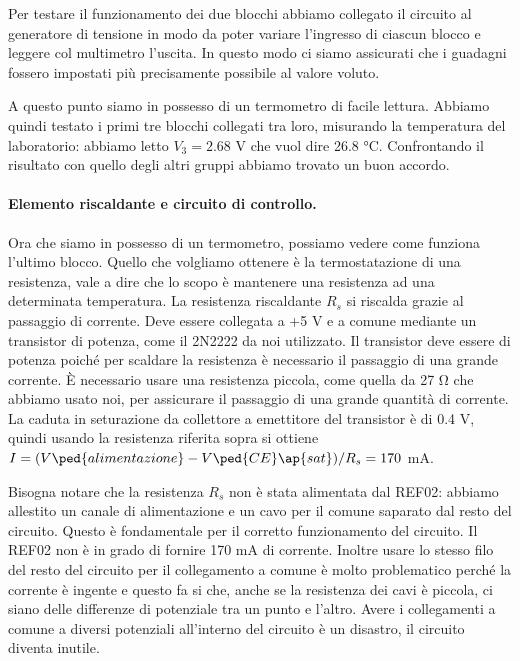 Per testare il funzionamento dei due blocchi abbiamo collegato il circuito al generatore di tensione in modo da
poter variare l'ingresso di ciascun blocco e leggere col multimetro l'uscita. In questo modo ci siamo assicurati
che i guadagni fossero impostati più precisamente possibile al valore voluto.

A questo punto siamo in possesso di un termometro di facile lettura. Abbiamo quindi testato i primi tre blocchi
collegati tra loro, misurando la temperatura del laboratorio: abbiamo letto $V_3 = 2.68$ V che vuol dire 26.8 \si{\celsius}.
Confrontando il risultato con quello degli altri gruppi abbiamo trovato un buon accordo.

\paragraph{Elemento riscaldante e circuito di controllo.}

Ora che siamo in possesso di un termometro, possiamo vedere come funziona l'ultimo blocco. Quello che volgliamo
ottenere è la termostatazione di una resistenza, vale a dire che lo scopo è mantenere una resistenza ad una determinata temperatura.
La resistenza riscaldante $R_s$ si riscalda grazie al passaggio di corrente. Deve essere collegata a +5 V e a comune
mediante un transistor di potenza, come il 2N2222 da noi utilizzato. Il transistor deve essere di potenza poiché per scaldare
la resistenza è necessario il passaggio di una grande corrente. È necessario usare una resistenza piccola, come quella
da 27 \si{\ohm} che abbiamo usato noi, per assicurare il passaggio di una grande quantità di corrente. La caduta in seturazione
da collettore a emettitore del transistor è di 0.4 V, quindi usando la resistenza riferita sopra si ottiene
$I = (V\ped{alimentazione} - V\ped{CE}\ap{sat}) / R_s = 170$ mA.

Bisogna notare che la resistenza $R_s$ non è stata alimentata dal REF02: abbiamo allestito un canale di alimentazione e un cavo
per il comune saparato dal resto del circuito. Questo è fondamentale per il corretto funzionamento del circuito.
Il REF02 non è in grado di fornire 170 mA di corrente. Inoltre usare lo stesso filo del resto del circuito per il collegamento
a comune è molto problematico perché la corrente è ingente e questo fa si che, anche se la resistenza dei cavi è piccola,
ci siano delle differenze di potenziale tra un punto e l'altro. Avere i collegamenti a comune a diversi potenziali
all'interno del circuito è un disastro, il circuito diventa inutile.

